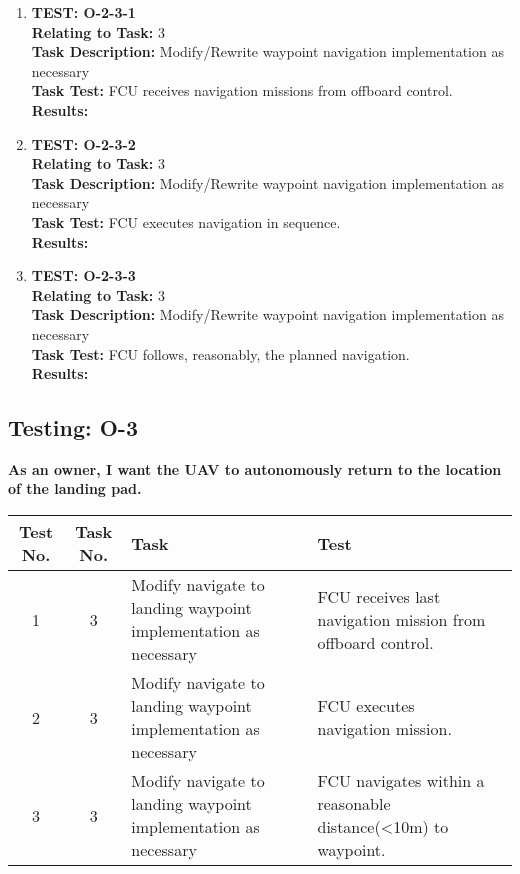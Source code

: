 \begin{enumerate}
\item \textbf{TEST: O-2-3-1}\\
\textbf{Relating to Task:} 3\\
\textbf{Task Description:} Modify/Rewrite waypoint navigation implementation as necessary\\
\textbf{Task Test:} FCU receives navigation missions from offboard control.\\
\textbf{Results:} 

\item \textbf{TEST: O-2-3-2}\\
\textbf{Relating to Task:} 3\\
\textbf{Task Description:} Modify/Rewrite waypoint navigation implementation as necessary \\
\textbf{Task Test:} FCU executes navigation in sequence.\\
\textbf{Results:} 

\item \textbf{TEST: O-2-3-3}\\
\textbf{Relating to Task:} 3\\
\textbf{Task Description:} Modify/Rewrite waypoint navigation implementation as necessary \\
\textbf{Task Test:} FCU follows, reasonably, the planned navigation.\\
\textbf{Results:} 
\end{enumerate}

\subsection{Testing: O-3}
\textbf{As an owner, I want the UAV to autonomously return to the location of the landing pad.}\\
\begin{tabular}{| c | c | >{\raggedright}m{4cm} | m{4cm} | c |}\hline
	Test No. & Task No. & Task & Test\\\hline
	1 & 3 & Modify navigate to landing waypoint implementation as necessary & FCU receives last navigation mission from offboard control.\\\hline
	2 & 3 & Modify navigate to landing waypoint implementation as necessary & FCU executes navigation mission.\\\hline
	3 & 3 & Modify navigate to landing waypoint implementation as necessary & FCU navigates within a reasonable distance(\textless 10m) to waypoint.\\\hline
\end{tabular}

